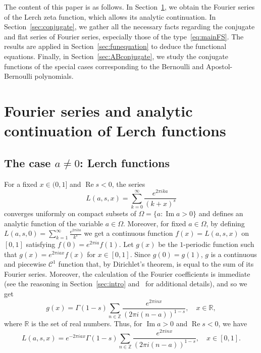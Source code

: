 \documentclass[11pt,a4paper,reqno]{amsart}
\newcommand{\R}{\mathbb{R}}
\newcommand{\Z}{\mathbb{Z}}
\renewcommand{\Re}{\operatorname{Re}}
\renewcommand{\Im}{\operatorname{Im}}
\theoremstyle{plain}
\theoremstyle{remark}
\numberwithin{equation}{section}
\begin{document}
The content of this paper is as follows. In Section~\ref{sec:FSLerch}, we obtain the Fourier series of the Lerch zeta function, which allows its analytic continuation. In Section~\ref{sec:conjugate}, we gather all the necessary facts regarding the conjugate and flat series of Fourier series, especially those of the type~\eqref{eq:mainFS}. The results are applied in Section~\ref{sec:funequation} to deduce the functional equations. Finally, in Section~\ref{sec:ABconjugate}, we study the conjugate functions of the special cases corresponding to the Bernoulli and Apostol-Bernoulli polynomials.

\section{Fourier series and analytic continuation of Lerch functions}
\label{sec:FSLerch}

\subsection{The case \texorpdfstring{$a\not=0$}{a!=0}: Lerch functions}

For a fixed $x \in (0,1]$ and $\Re s < 0$, the series
\begin{equation}
\label{eq:Lerchzeta2}
  L(a,s,x) = \sum_{k=0}^\infty\frac{e^{2\pi ika}}{(k+x)^s}
\end{equation}
converges uniformly on compact subsets of $\Omega=\{a:\Im a>0\}$ and defines an analytic function of the variable $a\in\Omega$. Moreover, for fixed $a\in\Omega$, by defining $L(a,s,0) = \sum_{k=1}^\infty\frac{e^{2\pi ika}}{k^s}$ we get a continuous function $f(x) = L(a,s,x)$ on $[0,1]$ satisfying $f(0)=e^{2\pi ia}f(1)$. Let $g(x)$ be the $1$-periodic function such that $g(x)=e^{2\pi iax}f(x)$ for $x\in [0,1]$. Since $g(0)=g(1)$, $g$ is a continuous and piecewise $\mathcal{C}^{1}$ function that, by Dirichlet's theorem, is equal to the sum of its Fourier series. Moreover, the calculation of the Fourier coefficients is immediate (see the reasoning in Section~\ref{sec:intro} and~\cite{NRV-JAT2} for additional details), and so we get
\begin{equation*}
  g(x) = \Gamma(1-s)\sum_{n\in\Z} \frac{e^{2\pi inx}}{(2\pi i(n-a))^{1-s}},
  \quad x\in\R,
\end{equation*}
where $\R$ is the set of real numbers.
Thus, for $\Im a>0$ and $\Re s<0$, we have
\begin{equation}
\label{eq:Fszetafunction}
  L(a,s,x) = e^{-2\pi iax} \Gamma(1-s) \sum_{n\in\Z} \frac{e^{2\pi inx}}{(2\pi i(n-a))^{1-s}},
  \quad x\in [0,1].
\end{equation}
\end{document}
